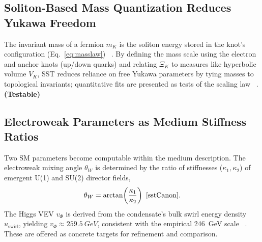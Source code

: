 \documentclass[10pt,reprint,aps,onecolumn,nofootinbib]{revtex4-2}
\newcommand{\testable}{\textbf{(Testable)}}
\begin{document}
    \subsection*{Soliton-Based Mass Quantization Reduces Yukawa Freedom}
        The invariant mass of a fermion $m_K$ is the soliton energy stored in the knot’s configuration (Eq.~\ref{eq:masslaw})~ \cite{sstLagrangian}. By defining the mass scale using the electron and anchor knots (up/down quarks) and relating $\Xi_K$ to measures like hyperbolic volume $V_K$, SST reduces reliance on free Yukawa parameters by tying masses to topological invariants; quantitative fits are presented as tests of the scaling law~ \cite{sstLagrangian}. \testable

    \subsection*{Electroweak Parameters as Medium Stiffness Ratios}
        Two SM parameters become computable within the medium description. The electroweak mixing angle $\theta_W$ is determined by the ratio of stiffnesses ($\kappa_1,\kappa_2$) of emergent U(1) and SU(2) director fields,
        \[
            \theta_W = \arctan\!\left(\frac{\kappa_1}{\kappa_2}\right)~ \cite{sstCanon}.
        \]
        The Higgs VEV $v_\Phi$ is derived from the condensate’s bulk swirl energy density $u_{\text{swirl}}$, yielding $v_\Phi \approx \SI{259.5}{GeV}$, consistent with the empirical \SI{246}{GeV} scale~ \cite{sstCanon}. These are offered as concrete targets for refinement and comparison.
\end{document}
